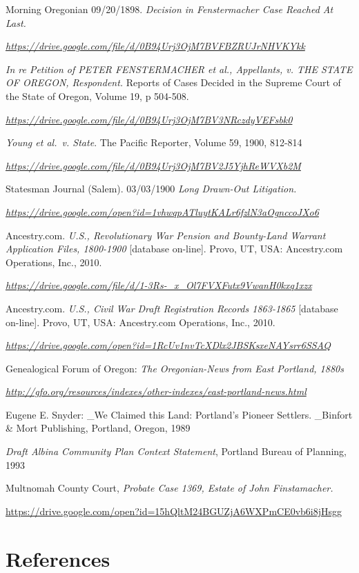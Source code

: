 \documentclass[
  12pt,
]{book}
\begin{document}
Morning Oregonian 09/20/1898. \emph{Decision in Fenstermacher Case Reached At Last.}

\emph{\url{https://drive.google.com/file/d/0B94Urj3OjM7BVFBZRUJrNHVKYkk}}

\emph{In re Petition of PETER FENSTERMACHER et al., Appellants, v. THE STATE OF OREGON, Respondent.} Reports of Cases Decided in the Supreme Court of the State of Oregon, Volume 19, p 504-508.

\emph{\url{https://drive.google.com/file/d/0B94Urj3OjM7BV3NRczdyVEFsbk0}}

\emph{Young et al.~v. State}. The Pacific Reporter, Volume 59, 1900, 812-814

\emph{\url{https://drive.google.com/file/d/0B94Urj3OjM7BV2J5YjhReWVXb2M}}

Statesman Journal (Salem). 03/03/1900 \emph{Long Drawn-Out Litigation.}

\emph{\url{https://drive.google.com/open?id=1vhwqpATluytKALr6fzlN3aOgnccoJXo6}}

Ancestry.com. \emph{U.S., Revolutionary War Pension and Bounty-Land Warrant Application Files, 1800-1900 }{[}database on-line{]}. Provo, UT, USA: Ancestry.com Operations, Inc., 2010.

\emph{\url{https://drive.google.com/file/d/1-3Rs-_x_Ol7FVXFutx9VwanH0kxq1xzx}}

Ancestry.com. \emph{U.S., Civil War Draft Registration Records 1863-1865 }{[}database on-line{]}. Provo, UT, USA: Ancestry.com Operations, Inc., 2010.

\emph{\url{https://drive.google.com/open?id=1RcUv1nvTcXDlx2JBSKsxeNAYsrr6SSAQ}}

Genealogical Forum of Oregon: \emph{The Oregonian-News from East Portland, 1880s}

\emph{\url{http://gfo.org/resources/indexes/other-indexes/east-portland-news.html}}

Eugene E. Snyder: \_We Claimed this Land: Portland's Pioneer Settlers. \_Binfort \& Mort Publishing, Portland, Oregon, 1989

\emph{Draft Albina Community Plan Context Statement}, Portland Bureau of Planning, 1993

Multnomah County Court, \emph{Probate Case 1369, Estate of John Finstamacher.}

\url{https://drive.google.com/open?id=15hQltM24BGUZjA6WXPmCE0vb6i8jHsgg}

\hypertarget{references-8}{%
\chapter*{References}\label{references-8}}
\end{document}
